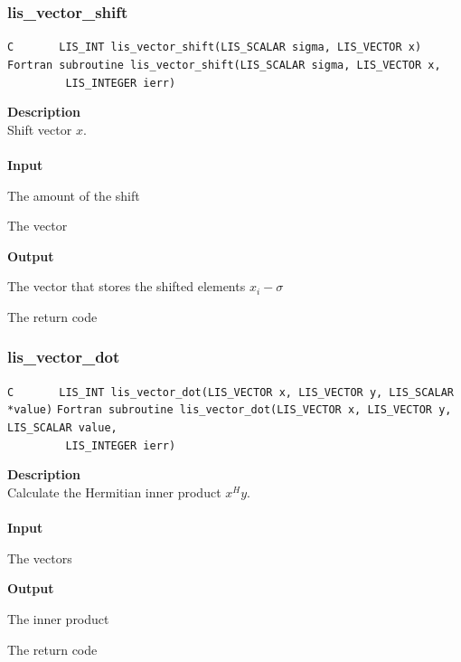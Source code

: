 \documentclass[a4paper]{article}
\newcommand{\namelistlabel}[1]{\mbox{#1}\hfill}
\newenvironment{namelist}[1]{%
\begin{list}{}
  {\let\makelabel\namelistlabel
  \settowidth{\labelwidth}{#1}
  \setlength{\leftmargin}{1.1\labelwidth}}
  }{%
\end{list}}
\begin{document}
\subsubsection{lis\_vector\_shift}
\begin{screen}
\verb|C       LIS_INT lis_vector_shift(LIS_SCALAR sigma, LIS_VECTOR x)|\\
\verb|Fortran subroutine lis_vector_shift(LIS_SCALAR sigma, LIS_VECTOR x,|\\
\verb|         LIS_INTEGER ierr)|
\end{screen}
{\bf Description}\\
\indent
Shift vector $x$.
\\ \\
\noindent
{\bf Input}
\begin{namelist}{XXXXXXXXXXXXXXXXXXXX}
\item[\tt sigma] The amount of the shift
\item[\tt x] The vector
\end{namelist}
{\bf Output}
\begin{namelist}{XXXXXXXXXXXXXXXXXXXX}
\item[\tt x] The vector that stores the shifted elements $x_i-\sigma$
\item[\tt ierr] The return code
\end{namelist}

\newpage
\subsubsection{lis\_vector\_dot}
\begin{screen}
\verb|C       LIS_INT lis_vector_dot(LIS_VECTOR x, LIS_VECTOR y, LIS_SCALAR *value)|
\verb|Fortran subroutine lis_vector_dot(LIS_VECTOR x, LIS_VECTOR y, LIS_SCALAR value,|\\
\verb|         LIS_INTEGER ierr)|
\end{screen}
{\bf Description}\\
\indent
Calculate the Hermitian inner product $x^{H}y$.
\\ \\
\noindent
{\bf Input}
\begin{namelist}{XXXXXXXXXXXXXXXXXXXX}
\item[\tt x, y] The vectors
\end{namelist}
{\bf Output}
\begin{namelist}{XXXXXXXXXXXXXXXXXXXX}
\item[\tt value] The inner product
\item[\tt ierr] The return code
\end{namelist}
\end{document}
